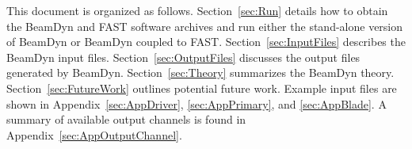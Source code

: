 This document is organized as follows. Section~\ref{sec:Run} details how to obtain the BeamDyn and FAST software archives and run either the stand-alone version of BeamDyn or BeamDyn coupled to FAST. Section~\ref{sec:InputFiles} describes the BeamDyn input files. Section~\ref{sec:OutputFiles} discusses the output files generated by BeamDyn. Section~\ref{sec:Theory} summarizes the BeamDyn theory. Section~\ref{sec:FutureWork} outlines potential future work. Example input files are shown in Appendix~\ref{sec:AppDriver}, \ref{sec:AppPrimary}, and  \ref{sec:AppBlade}. A summary of available output channels is found in Appendix~\ref{sec:AppOutputChannel}.
